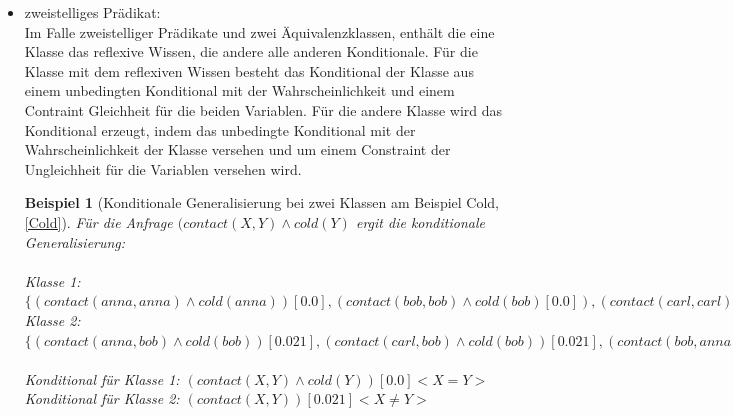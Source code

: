 \documentclass[a4paper, 11pt]{book}
\newtheorem{Bsp}{Beispiel}[section]
\begin{document}
{\begin{itemize}
\begin{itemize}
		Dazu konnte kein Beispiel gefunden werden.
		\item zweistelliges Prädikat:\\
		Im Falle zweistelliger Prädikate und zwei Äquivalenzklassen, enthält die eine Klasse das reflexive Wissen, die andere alle anderen Konditionale. Für die Klasse mit dem reflexiven Wissen besteht das Konditional der Klasse aus einem unbedingten Konditional mit der Wahrscheinlichkeit und einem Contraint Gleichheit für die beiden Variablen. Für die andere Klasse wird das Konditional erzeugt, indem das unbedingte Konditional mit der Wahrscheinlichkeit der Klasse versehen und um einem Constraint der Ungleichheit für die Variablen versehen wird.
		\begin{Bsp}[Konditionale Generalisierung bei zwei Klassen am Beispiel Cold, \ref{Cold}]
			Für die Anfrage $ (contact(X,Y) \land cold(Y) $ ergit die konditionale Generalisierung:\\
			\\
		Klasse 1: $ \{ (contact(anna,anna) \land cold(anna))[0.0], (contact(bob,bob) \land cold(bob)[0.0]), (contact(carl,carl)\land cold(carl))[0.0]\} $\\
		Klasse 2: $ \{(contact(anna,bob) \land cold(bob))[0.021] , (contact(carl, bob) \land cold(bob))[0.021] , (contact(bob, anna) \land cold(anna))[0.021], (contact(anna, carl)\land cold(carl)) [0.021], (contact(bob, carl)\land cold(carl)) [0.021], (contact(carl, anna) \land cold(anna))[0.021] \} $\\
		\\
		Konditional für Klasse 1: $ (contact(X,Y) \land cold(Y))[0.0] <X = Y> $\\
		Konditional für Klasse 2: $ (contact(X,Y))[0.021] <X \neq Y> $\\
		\end{Bsp}
	\end{itemize}
\end{itemize}
}
\end{document}

